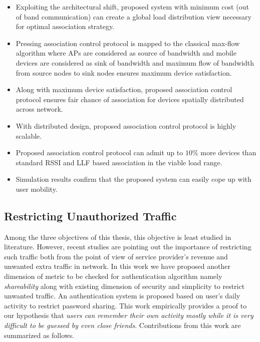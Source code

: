 \begin{itemize}
\item Exploiting the architectural shift, proposed system with minimum cost (out of band communication) can create a global load distribution view necessary for optimal association strategy.\\
\item Pressing association control protocol is mapped to the classical max-flow algorithm where APs are considered as source of bandwidth and mobile devices are considered as sink of bandwidth and maximum flow of bandwidth from source nodes to sink nodes ensures maximum device satisfaction.\\
\item Along with maximum device satisfaction, proposed association control protocol ensures fair chance of association for devices spatially distributed across network.\\
\item With distributed design, proposed association control protocol is highly scalable.\\
\item Proposed association control protocol can admit up to $10\%$ more devices than standard RSSI and LLF based association in the viable load range.\\
\item Simulation results confirm that the proposed system can easily cope up with user mobility.\\
\end{itemize}
\subsection{Restricting Unauthorized Traffic} Among the three objectives of this thesis, this objective is least studied in literature. However, recent studies are pointing out the importance of restricting such traffic both from the point of view of service provider's revenue and unwanted extra traffic in network. In this work we have proposed another dimension of metric to be checked for authentication algorithm namely {\em shareability} along with existing dimension of security and simplicity to restrict unwanted traffic. An authentication system is proposed based on user's daily activity to restrict password sharing. This work empirically provides a proof to our hypothesis that {\em users can remember their own activity mostly while it is very difficult to be guessed by even close friends}. Contributions from this work are summarized as follows. 

